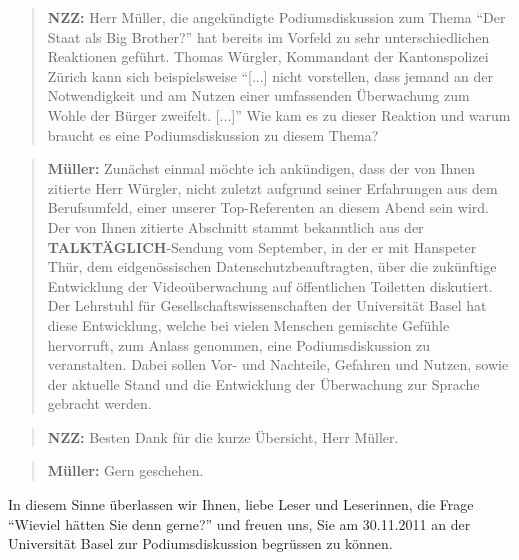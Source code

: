 \begin{quote}
\textbf{NZZ:} Herr Müller, die angekündigte Podiumsdiskussion zum Thema
"`Der Staat als Big Brother?"' hat bereits im Vorfeld zu
sehr unterschiedlichen Reaktionen geführt. Thomas Würgler, 
Kommandant der Kantonspolizei Zürich kann sich beispielsweise "`[...] nicht
 vorstellen, dass jemand an der Notwendigkeit und am Nutzen
 einer umfassenden Überwachung zum Wohle der Bürger zweifelt. [...]"'
Wie kam es zu dieser Reaktion und warum braucht es eine  
Podiumsdiskussion zu diesem Thema?
\end{quote}
\begin{quote}
\textbf{Müller:} Zunächst einmal möchte ich ankündigen, dass
der von Ihnen zitierte Herr Würgler, nicht zuletzt aufgrund
seiner Erfahrungen aus dem Berufsumfeld, einer unserer Top-Refe\-renten
an diesem Abend sein wird. Der von Ihnen zitierte Abschnitt stammt
bekanntlich aus der \textbf{TALKTÄGLICH}-Sendung vom September,
in der er mit Hanspeter Thür,
dem eidgenössischen Datenschutzbeauftragten, über die zukünftige
Entwicklung der Videoüberwachung auf öffentlichen Toiletten
diskutiert.
Der Lehrstuhl für Gesellschaftswissenschaften der Universität Basel
hat diese Entwicklung, welche bei vielen Menschen gemischte Gefühle
hervorruft, zum Anlass genommen, eine Podiumsdiskussion zu veranstalten.
Dabei sollen Vor- und Nachteile, Gefahren und Nutzen, sowie der aktuelle
 Stand und die Entwicklung der Überwachung zur Sprache gebracht werden.
\end{quote}
\begin{quote}
\textbf{NZZ:} Besten Dank für die kurze Übersicht,
Herr Müller.
\end{quote}
\begin{quote}
\textbf{Müller:} Gern geschehen.
\end{quote}
In diesem Sinne überlassen wir Ihnen, liebe Leser und Leserinnen,
die Frage "`Wieviel hätten Sie denn gerne?"' und freuen uns, Sie am
30.11.2011 an der Universität Basel zur Podiumsdiskussion
begrüssen zu können.
